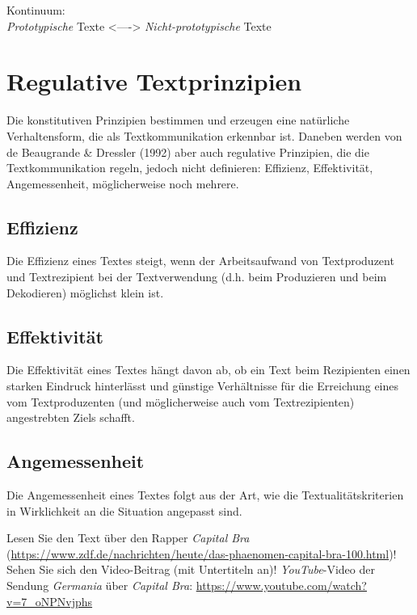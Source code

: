 \documentclass[
  letterpaper,
]{scrbook}
\begin{document}
Kontinuum:\\
\emph{Prototypische} Texte \textless----\textgreater{}
\emph{Nicht-prototypische} Texte

\hypertarget{regulative-textprinzipien}{%
\section{Regulative Textprinzipien}\label{regulative-textprinzipien}}

Die konstitutiven Prinzipien bestimmen und erzeugen eine natürliche
Verhaltensform, die als Textkommunikation erkennbar ist. Daneben werden
von de Beaugrande \& Dressler (1992) aber auch regulative Prinzipien,
die die Textkommunikation regeln, jedoch nicht definieren: Effizienz,
Effektivität, Angemessenheit, möglicherweise noch mehrere.

\hypertarget{effizienz}{%
\subsection{Effizienz}\label{effizienz}}

Die Effizienz eines Textes steigt, wenn der Arbeitsaufwand von
Textproduzent und Textrezipient bei der Textverwendung (d.h. beim
Produzieren und beim Dekodieren) möglichst klein ist.

\hypertarget{effektivituxe4t}{%
\subsection{Effektivität}\label{effektivituxe4t}}

Die Effektivität eines Textes hängt davon ab, ob ein Text beim
Rezipienten einen starken Eindruck hinterlässt und günstige Verhältnisse
für die Erreichung eines vom Textproduzenten (und möglicherweise auch
vom Textrezipienten) angestrebten Ziels schafft.

\hypertarget{angemessenheit}{%
\subsection{Angemessenheit}\label{angemessenheit}}

Die Angemessenheit eines Textes folgt aus der Art, wie die
Textualitätskriterien in Wirklichkeit an die Situation angepasst sind.

Lesen Sie den Text über den Rapper \emph{Capital Bra}
(\url{https://www.zdf.de/nachrichten/heute/das-phaenomen-capital-bra-100.html})!
Sehen Sie sich den Video-Beitrag (mit Untertiteln an)!
\emph{YouTube}-Video der Sendung \emph{Germania} über \emph{Capital
Bra}: \url{https://www.youtube.com/watch?v=7_oNPNvjphs}
\end{document}
